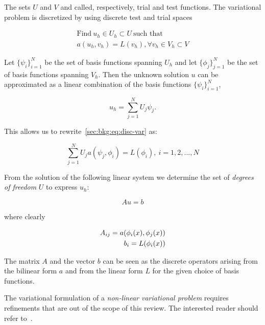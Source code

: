 The sets $U$ and $V$ and called, respectively, trial and test functions. The variational problem is discretized by using discrete test and trial spaces

\begin{equation}
\label{sec:bkg:eq:disc-var}
\begin{split}
\text{Find}\ u_h \in U_h \subset U\ \text{such that} \\
a(u_h, v_h) = L(v_h), \forall v_h \in V_h \subset V
\end{split}
\end{equation}

Let $\lbrace \psi_i \rbrace_{i=1}^N$ be the set of basis functions spanning $U_h$ and let $\lbrace \phi_j \rbrace_{j=1}^{N}$ be the set of basis functions spanning $V_h$. Then the unknown solution $u$ can be approximated as a linear combination of the basis functions $\lbrace \psi_i \rbrace_{i=1}^N$,

\begin{equation}
u_h = \sum_{j=1}^N U_j \psi_j.
\end{equation}

This allows us to rewrite~\ref{sec:bkg:eq:disc-var} as:

\begin{equation}
\sum_{j=1}^N U_j a(\psi_j, \phi_i) = L(\phi_i),\ i=1,2,...,N
\end{equation}

From the solution of the following linear system we determine the set of {\em degrees of freedom} $U$ to express $u_h$:

\begin{equation}
\label{sec:bkg:eq:lin-sys}
Au = b
\end{equation}

where clearly

\begin{equation}
\label{sec:bkg:eq:disc-op}
\centering
\begin{split}
A_{ij} = a(\phi_i(x), \phi_j(x)) \\
b_i = L(\phi_i(x))
\end{split}
\end{equation}

The matrix $A$ and the vector $b$ can be seen as the discrete operators arising from the bilinear form $a$ and from the linear form $L$ for the given choice of basis functions.

The variational formulation of a {\em non-linear variational problem} requires refinements that are out of the scope of this review. The interested reader should refer to~\cite{brenner-and-scott}.

